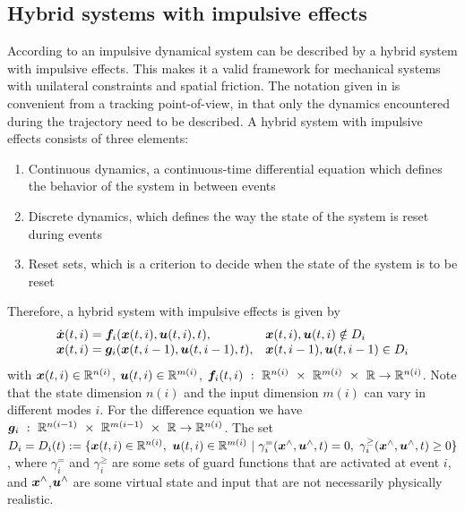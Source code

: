 \documentclass[../DC2017114Bouma.tex]{subfiles}
\begin{document}
\subsection{Hybrid systems with impulsive effects}\label{sec:2hyb}
According to \cite{Haddad2006} an impulsive dynamical system can be described by a hybrid system with impulsive effects. This makes it a valid framework for mechanical systems with unilateral constraints and spatial friction. The notation given in \cite{Haddad2006} is convenient from a tracking point-of-view, in that only the dynamics encountered during the trajectory need to be described. A hybrid system with impulsive effects consists of three elements:
\begin{enumerate}
\item Continuous dynamics, a continuous-time differential equation which defines the behavior of the system in between events
\item Discrete dynamics, which defines the way the state of the system is reset during events
\item Reset sets, which is a criterion to decide when the state of the system is to be reset
\end{enumerate}

Therefore, a hybrid system with impulsive effects is given by
\begin{equation}
\begin{array}{ll}
\dot{{\boldsymbol{x}}}(t,i) ={\boldsymbol{f}}_i({\boldsymbol{x}}(t,i),{\boldsymbol{u}}(t,i),t),& {\boldsymbol{x}}(t,i),{\boldsymbol{u}}(t,i)\notin D_i\\
{\boldsymbol{x}}(t,i) = {\boldsymbol{g}}_i({\boldsymbol{x}}(t,i-1),{\boldsymbol{u}}(t,i-1),t),& {\boldsymbol{x}}(t,i-1),{\boldsymbol{u}}(t,i-1)\in D_i
\end{array}\label{eq:hybimp}
\end{equation}
with ${\boldsymbol{x}}(t,i)\in\mathbb{R}^{n(i)}$, ${\boldsymbol{u}}(t,i)\in\mathbb{R}^{m(i)}$, $\fb_i(t,i)\ :\ \Rbb^{n(i)}\ \times\ \Rbb^{m(i)}\ \times\ \Rbb\rightarrow \Rbb^{n(i)}$. Note that the state dimension $n(i)$ and the input dimension $m(i)$ can vary in different modes $i$. For the difference equation we have $\gb_i\ :\ \Rbb^{n(i-1)}\ \times\ \Rbb^{m(i-1)}\ \times\ \Rbb\rightarrow \Rbb^{n(i)}$. The set $D_i = D_i(t) := \{\xb(t,i)\in\Rbb^{n(i)},\ \ub(t,i)\in\Rbb^{m(i)}\ |\ \gamma^{=}_i(\xb^{\wedge},\ub^{\wedge},t) = 0, \ \gamma^{\geq}_i(\xb^{\wedge},\ub^{\wedge},t) \geq 0\}$, where $\gamma^{=}_i$ and $\gamma^{\geq}_i$ are some sets of guard functions that are activated at event $i$, and ${\boldsymbol{x}}^{\wedge}$,${\boldsymbol{u}}^{\wedge}$ are some virtual state and input that are not necessarily physically realistic.
\end{document}
